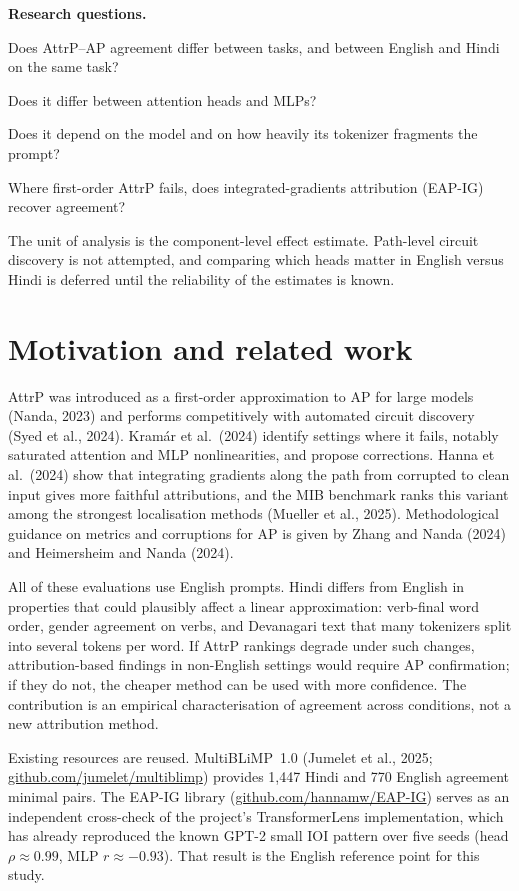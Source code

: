 \documentclass[10pt,a4paper]{article}
\begin{document}
\textbf{Research questions.}
\begin{description}[leftmargin=2.8em,itemsep=0.1em]
  \item[(RQ1)] Does AttrP--AP agreement differ between tasks, and between English and Hindi on the same task?
  \item[(RQ2)] Does it differ between attention heads and MLPs?
  \item[(RQ3)] Does it depend on the model and on how heavily its tokenizer fragments the prompt?
  \item[(RQ4)] Where first-order AttrP fails, does integrated-gradients attribution (EAP-IG) recover agreement?
\end{description}
The unit of analysis is the component-level effect estimate. Path-level circuit discovery is not attempted, and comparing which heads matter in English versus Hindi is deferred until the reliability of the estimates is known.

\section{Motivation and related work}
AttrP was introduced as a first-order approximation to AP for large models (Nanda, 2023) and performs competitively with automated circuit discovery (Syed et al., 2024). Kram\'ar et al.\ (2024) identify settings where it fails, notably saturated attention and MLP nonlinearities, and propose corrections. Hanna et al.\ (2024) show that integrating gradients along the path from corrupted to clean input gives more faithful attributions, and the MIB benchmark ranks this variant among the strongest localisation methods (Mueller et al., 2025). Methodological guidance on metrics and corruptions for AP is given by Zhang and Nanda (2024) and Heimersheim and Nanda (2024).

All of these evaluations use English prompts. Hindi differs from English in properties that could plausibly affect a linear approximation: verb-final word order, gender agreement on verbs, and Devanagari text that many tokenizers split into several tokens per word. If AttrP rankings degrade under such changes, attribution-based findings in non-English settings would require AP confirmation; if they do not, the cheaper method can be used with more confidence. The contribution is an empirical characterisation of agreement across conditions, not a new attribution method.

Existing resources are reused. MultiBLiMP~1.0 (Jumelet et al., 2025; \url{github.com/jumelet/multiblimp}) provides 1{,}447 Hindi and 770 English agreement minimal pairs. The EAP-IG library (\url{github.com/hannamw/EAP-IG}) serves as an independent cross-check of the project's TransformerLens implementation, which has already reproduced the known GPT-2 small IOI pattern over five seeds (head $\rho \approx 0.99$, MLP $r \approx -0.93$). That result is the English reference point for this study.
\end{document}

